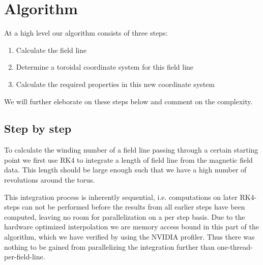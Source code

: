 \documentclass[a4paper]{article}
\begin{document}
\section{Algorithm}
At a high level our algorithm consists of three steps: 
\begin{enumerate}
	\item Calculate the field line
	\item Determine a toroidal coordinate system for this field line
	\item Calculate the required properties in this new coordinate system
\end{enumerate}
We will further eleborate on these steps below and comment on the complexity.\\

\subsection{Step by step}

To calculate the winding number of a field line passing through a certain starting point we first use RK4 to integrate a length of field line from the magnetic field data. This length should be large enough such that we have a high number of revolutions around the torus.

This integration process is inherently sequential, i.e. computations on later RK4-steps can not be performed before the results from all earlier steps have been computed, leaving no room for parallelization on a per step basis.
Due to the hardware optimized interpolation we are memory access bound in this part of the algorithm, which we have verified by using the NVIDIA profiler. 
Thus there was nothing to be gained from parallelizing the integration further than one-thread-per-field-line.
\end{document}
